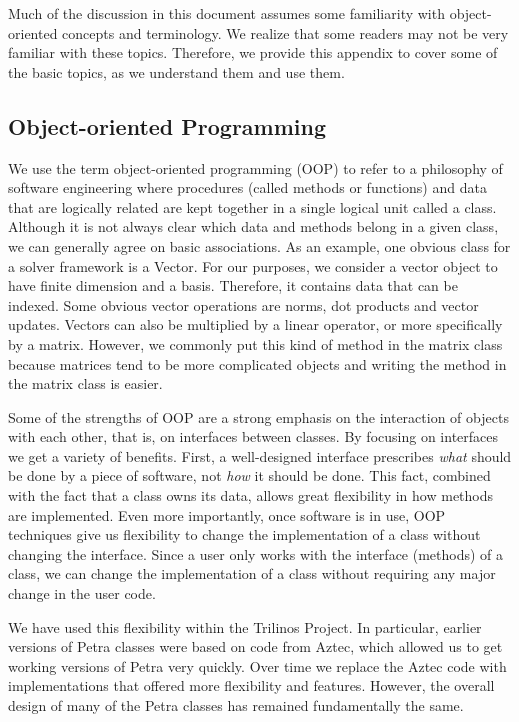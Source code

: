 \documentclass[12pt,relax]{TrilinosOverview}
\begin{document}
Much of the discussion in this document assumes some familiarity with
object-oriented	concepts and terminology. We realize that some readers may not
be very familiar with these topics. Therefore, we provide this appendix to
cover some of the basic topics, as we understand them and use them.

\subsection{Object-oriented Programming}
We use the term object-oriented programming (OOP) to refer to a philosophy of 
software engineering where procedures (called methods or functions) and data
that are logically related are kept together in a single logical unit called a
class.  Although it is not always clear which data and methods belong in a
given class, we can generally agree on basic associations.  As an example, one
obvious class for a solver framework is a Vector.  For our purposes, we
consider a vector object to have finite dimension and a basis.  Therefore, it
contains data that can be indexed.  Some obvious vector operations are norms,
dot products and vector updates.  Vectors can also be multiplied by a linear operator,
or more specifically by a matrix.  However, we commonly put this kind of method in the matrix
class because matrices tend to be more complicated objects and writing the method in the matrix
class is easier.

Some of the strengths of OOP are a strong emphasis on the interaction of objects with each
other, that is, on interfaces between classes.  By focusing on interfaces we get a variety of
benefits.  First, a well-designed interface prescribes {\it what} should be done by a piece of
software, not {\it how} it should be done.  This fact, combined with the fact that a class
owns its data, allows great flexibility in how methods are implemented.  Even more importantly,
once software is in use, OOP techniques give us flexibility to change the implementation
of a class without changing the interface.  Since a user only works with the interface 
(methods) of a class, we can change the implementation of a class without requiring any major
change in the user code.  

We have used this flexibility within the Trilinos Project.  In particular, earlier versions
of Petra classes were based on code from Aztec, which allowed us to get working versions of Petra
very quickly.  Over time we replace the Aztec code with implementations that offered more
flexibility and features.  However, the overall design of many of the Petra classes has
remained fundamentally the same.
\end{document}
